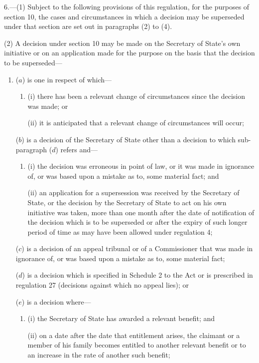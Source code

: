 \documentclass[12pt,a4paper]{article}
\begin{document}
\renewcommand\parthead{--- Part II Chapter II}

6.—(1) Subject to the following provisions of this regulation, for the purposes of section 10, the cases and circumstances in which a decision may be superseded under that section are set out in paragraphs (2) to (4).

(2) A decision under section 10 may be made on the Secretary of State’s own initiative or on an application made for the purpose on the basis that the decision to be superseded—
\begin{enumerate}\item[]
($a$) is one in respect of which—
\begin{enumerate}\item[]
(i) there has been a relevant change of circumstances since the decision was made; or

(ii) it is anticipated that a relevant change of circumstances will occur;
\end{enumerate}

($b$) is a decision of the Secretary of State other than a decision to which sub-paragraph ($d$) refers and—
\begin{enumerate}\item[]
(i) the decision was erroneous in point of law, or it was made in ignorance of, or was based upon a mistake as to, some material fact; and

(ii) an application for a supersession was received by the Secretary of State, or the decision by the Secretary of State to act on his own initiative was taken, more than one month after the date of notification of the decision which is to be superseded or after the expiry of such longer period of time as may have been allowed under regulation 4;
\end{enumerate}

($c$) is a decision of an appeal tribunal or of a Commissioner that was made in ignorance of, or was based upon a mistake as to, some material fact;

($d$) is a decision which is specified in Schedule 2 to the Act or is prescribed in regulation 27 (decisions against which no appeal lies); or

($e$) is a decision where—
\begin{enumerate}\item[]
(i) the Secretary of State has awarded a relevant benefit; and

(ii) on a date after the date that entitlement arises, the claimant or a member of his family becomes entitled to another relevant benefit or to an increase in the rate of another such benefit;
\end{enumerate}


\end{enumerate}
\end{document}
